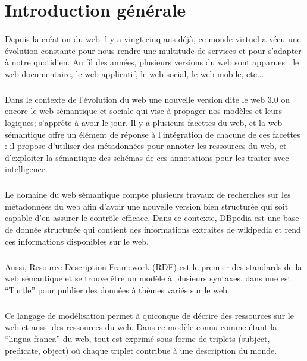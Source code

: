 \section*{Introduction générale}
\paragraph{}
Depuis la création du web il y a vingt-cinq ans déjà, ce monde virtuel a vécu une évolution constante pour nous rendre une multitude de services et pour s’adapter à notre quotidien. Au fil des années, plusieurs versions du web sont apparues : le web documentaire, le web applicatif, le web social, le web mobile, etc...
\subparagraph{}
Dans le contexte de l’évolution du web une nouvelle version dite le web 3.0 ou encore le web sémantique et sociale qui vise à propager nos modèles et leurs logiques; s’apprête à avoir le jour. Il y a plusieurs facettes du web, et la web sémantique offre un élément de réponse à l’intégration de chacune de ces facettes : il propose d’utiliser des métadonnées pour annoter les ressources du web, et d’exploiter la sémantique des schémas de ces annotations pour les traiter avec intelligence.
\subparagraph{}
Le domaine du web sémantique compte plusieurs travaux de recherches sur les métadonnées du web afin d’avoir une nouvelle version bien structurée qui soit capable d’en assurer le contrôle efficace. Dans ce contexte, DBpedia est une base de donnée structurée qui contient des informations extraites de wikipedia et rend ces informations disponibles sur le web.
\subparagraph{}
Aussi, Resource Description Framework (RDF) est le premier des standards de la web sémantique et se trouve être un modèle à plusieurs syntaxes, dans une est  “Turtle” pour publier des données à thèmes variés sur le web.
\subparagraph{}
Ce langage de modélisation permet à quiconque de décrire des ressources sur le web et aussi des ressources du web. Dans ce modèle connu comme étant la “lingua franca” du web, tout est exprimé sous forme de triplets (subject, predicate, object) où chaque triplet contribue à une description du monde.
